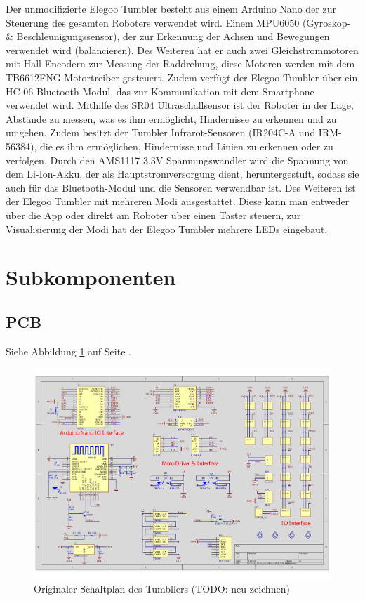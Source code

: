 Der unmodifizierte Elegoo Tumbler besteht aus einem Arduino Nano der zur Steuerung des gesamten Roboters verwendet wird. 
Einem MPU6050 (Gyroskop- \& Beschleunigungssensor), der zur Erkennung der Achsen und Bewegungen verwendet wird (balancieren). 
Des Weiteren hat er auch zwei Gleichstrommotoren mit Hall-Encodern zur Messung der Raddrehung, diese Motoren werden mit dem TB6612FNG Motortreiber gesteuert. 
Zudem verfügt der Elegoo Tumbler über ein HC-06 Bluetooth-Modul, das zur Kommunikation mit dem Smartphone verwendet wird. Mithilfe des SR04 Ultraschallsensor ist der Roboter in der Lage, 
Abstände zu messen, was es ihm ermöglicht, Hindernisse zu erkennen und zu umgehen.  
Zudem besitzt der Tumbler Infrarot-Sensoren (IR204C-A und IRM-56384), die es ihm ermöglichen, Hindernisse und Linien zu erkennen oder zu verfolgen. 
Durch den AMS1117 3.3V Spannungswandler wird die Spannung von dem Li-Ion-Akku, der als Hauptstromversorgung dient, heruntergestuft, 
sodass sie auch für das Bluetooth-Modul und die Sensoren verwendbar ist. Des Weiteren ist der Elegoo Tumbler mit mehreren Modi ausgestattet. 
Diese kann man entweder über die App oder direkt am Roboter über einen Taster steuern, zur Visualisierung der Modi hat der Elegoo Tumbler mehrere LEDs eingebaut.
\section{Subkomponenten}
\label{subsec:subkomponenten}
%
\subsection{PCB}
Siehe Abbildung \ref{fig:elegoo_tumbller_original_circuit} auf Seite \pageref{fig:elegoo_tumbller_original_circuit}.
%
\begin{figure}
    \includegraphics[width=\textwidth, center]{img/elegoo_tumbller_original_circuit.pdf}
    \caption{Originaler Schaltplan des Tumbllers (TODO: neu zeichnen)}
    \label{fig:elegoo_tumbller_original_circuit}
\end{figure}
%
